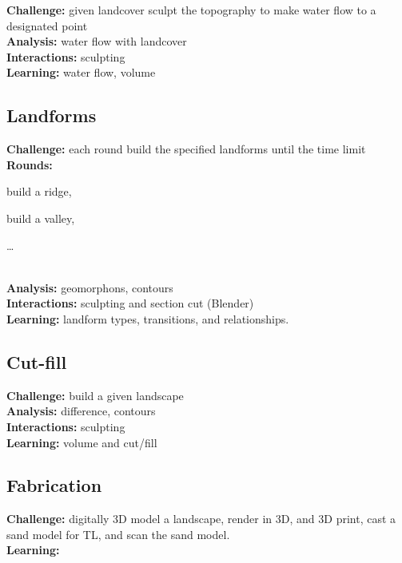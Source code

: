 \documentclass[final,3p,times,twocolumn]{elsarticle}
\begin{document}
\noindent
\textbf{Challenge:} given landcover sculpt the topography to make water flow to a designated point \\
\textbf{Analysis:} water flow with landcover \\
\textbf{Interactions:} sculpting  \\
\textbf{Learning:} water flow, volume \\

\subsection{Landforms}
\noindent
\textbf{Challenge:} each round build the specified landforms until the time limit \\
\textbf{Rounds:} 
\begin{enumerate*}
\item build a ridge,
\item build a valley,
\item \ldots
\end{enumerate*}\\
\textbf{Analysis:} geomorphons, contours \\
\textbf{Interactions:} sculpting  and section cut (Blender) \\
\textbf{Learning:} landform types, transitions, and relationships. \\ 


\subsection{Cut-fill} %
\noindent
\textbf{Challenge:} build a given landscape \\ %
\textbf{Analysis:} difference, contours \\
\textbf{Interactions:} sculpting  \\
\textbf{Learning:} volume and cut/fill \\

\subsection{Fabrication}
\noindent
\textbf{Challenge:} digitally 3D model a landscape, %
render in 3D, and 3D print, cast a sand model for TL, and scan the sand model.\\
\textbf{Learning:} 
\end{document}
